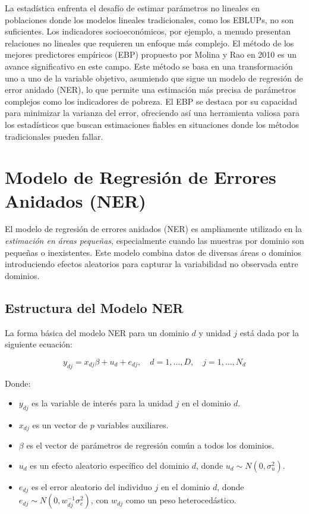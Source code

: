 \documentclass[12pt,spanish]{article}
\begin{document}
La estadística enfrenta el desafío de estimar parámetros no lineales en poblaciones donde los modelos lineales tradicionales, como los EBLUPs, no son suficientes. Los indicadores socioeconómicos, por ejemplo, a menudo presentan relaciones no lineales que requieren un enfoque más complejo. El método de los mejores predictores empíricos (EBP) propuesto por Molina y Rao en 2010 es un avance significativo en este campo. Este método se basa en una transformación uno a uno de la variable objetivo, asumiendo que sigue un modelo de regresión de error anidado (NER), lo que permite una estimación más precisa de parámetros complejos como los indicadores de pobreza. El EBP se destaca por su capacidad para minimizar la varianza del error, ofreciendo así una herramienta valiosa para los estadísticos que buscan estimaciones fiables en situaciones donde los métodos tradicionales pueden fallar.

\section*{Modelo de Regresión de Errores Anidados (NER)}

El modelo de regresión de errores anidados (NER) es ampliamente utilizado en la \textit{estimación en áreas pequeñas}, especialmente cuando las muestras por dominio son pequeñas o inexistentes. Este modelo combina datos de diversas áreas o dominios introduciendo efectos aleatorios para capturar la variabilidad no observada entre dominios.

\subsection*{Estructura del Modelo NER}

La forma básica del modelo NER para un dominio $d$ y unidad $j$ está dada por la siguiente ecuación:

\[
y_{dj} = x_{dj} \beta + u_d + e_{dj}, \quad d = 1, \dots, D, \quad j = 1, \dots, N_d
\]

Donde:
\begin{itemize}
    \item $y_{dj}$ es la variable de interés para la unidad $j$ en el dominio $d$.
    \item $x_{dj}$ es un vector de $p$ variables auxiliares.
    \item $\beta$ es el vector de parámetros de regresión común a todos los dominios.
    \item $u_d$ es un efecto aleatorio específico del dominio $d$, donde $u_d \sim N(0, \sigma_u^2)$.
    \item $e_{dj}$ es el error aleatorio del individuo $j$ en el dominio $d$, donde $e_{dj} \sim N(0, w_{dj}^{-1} \sigma_e^2)$, con $w_{dj}$ como un peso heterocedástico.
\end{itemize}
\end{document}
